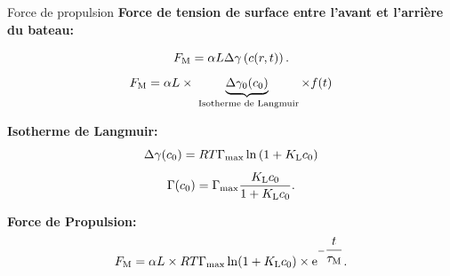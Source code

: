 \documentclass[aspectratio=169,10pt]{beamer}
\begin{document}
\begin{frame}{Force de propulsion}
  \textbf{Force de tension de surface entre l'avant et l'arrière du bateau:}
     
      \begin{equation}
        F_{\rm M} = \alpha L\Delta\gamma\left(c(r,t)\right).\nonumber 
      \end{equation}
      \begin{equation}
         F_{\rm M} = \alpha L \times \underbrace{\Delta\gamma_0(c_0)}_{\text{ Isotherme de Langmuir}}\times f(t)
    \end{equation}

    \textbf{Isotherme de Langmuir:}
    \begin{equation}
        \Delta\gamma(c_0) = RT\Gamma_{\rm max}\ln{\left(1+K_{\rm L}c_0\right)}
    \end{equation}
    \begin{equation}
        \Gamma(c_0) = \Gamma_{\rm max}\frac{K_{\rm L}c_0}{1+K_{\rm L}c_0}.\nonumber
    \end{equation}\pause
    \begin{ombredef}
      \begin{defi}
        \textbf{Force de Propulsion:}  
        \begin{equation}
          F_{\rm M} =\alpha L\times RT\Gamma_{\rm max}\ln(1+K_{\rm L}c_0)\times {\rm e}^{-\dfrac{t}{\tau_{\rm M}}}.
      \end{equation}
    \end{defi}
    \end{ombredef}
\end{frame}
\end{document}
